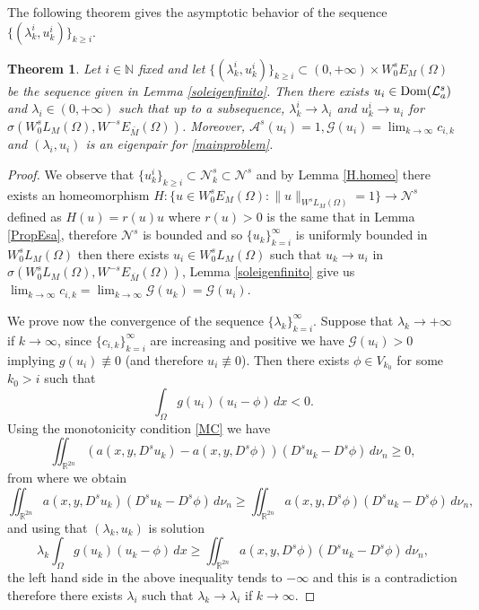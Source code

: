 \documentclass{amsart}
\def\Dom{\text{\normalfont Dom}}
\newcommand{\A}{\mathcal{L}_a^s}
\newcommand{\R}{{\mathbb R}}
\newcommand{\N}{{\mathbb N}}
\newcommand{\EE}{{\mathcal A}^s}
\newcommand{\G}{{\mathcal G}}
\newtheorem{teo}{Theorem}[section]
\theoremstyle{remark}
\theoremstyle{definition}
\numberwithin{equation}{section}
\begin{document}
The following theorem gives the asymptotic behavior of the sequence $\{(\lambda_k^i, u_k^i)\}_{k\ge i}$.
\begin{teo}\label{teolambdaiui}
Let $i\in\N$ fixed and let $\{(\lambda_k^i, u_k^i)\}_{k\ge i}\subset (0, +\infty)\times W^s_0 E_M(\Omega)$ be the sequence given in Lemma \ref{soleigenfinito}. Then there exists $u_i\in \Dom(\A)$ and $\lambda_i\in (0,+\infty)$ such that up to a subsequence, $\lambda_k^i\to \lambda_i$ and $u_k^i\to u_i$ for $\sigma(W_0^sL_M(\Omega),W^{-s}E_{\bar{M}}(\Omega))$. Moreover, $\EE(u_i)=1,\G(u_i)=\lim_{k\to\infty}c_{i,k}$ and $(\lambda_i,u_i)$ is an eigenpair for \eqref{mainproblem}.	
\end{teo}
\begin{proof}
We observe that $\{u_k^i\}_{k\ge i}\subset \mathcal{N}_k^s\subset \mathcal{N}^s$ and by Lemma \ref{H.homeo} there exists an homeomorphism $H\colon \{u\in W_0^s E_M(\Omega)\colon \|u\|_{W^sL_M(\Omega)}=1\}\to \mathcal{N}^s$ defined as $H(u)=r(u)u$ where $r(u)>0$ is the same that in Lemma \ref{PropEsa}, therefore $\mathcal{N}^s$ is bounded and so $\{u_k\}_{k=i}^\infty$ is uniformly bounded  in $W_0^sL_M(\Omega)$ then there exists $u_i\in W_0^sL_M(\Omega)$ such that $u_k\to u_i$ in $\sigma(W_0^sL_M(\Omega),W^{-s}E_{\bar{M}}(\Omega))$, Lemma \ref{soleigenfinito} give us $\lim_{k\to \infty} c_{i,k}=\lim_{k\to\infty}\G(u_k)=\G(u_i)$.

We prove now the convergence of the sequence $\{\lambda_k\}_{k=i}^\infty$. Suppose that $\lambda_k\to +\infty$ if $k\to \infty$, since $\{c_{i,k}\}_{k=i}^{\infty}$ are increasing and positive we have $\G(u_i)>0$ implying $g(u_i)\not\equiv  0$ (and therefore $u_i\not\equiv 0$). Then there exists $\phi\in  V_{k_0}$ for some $k_0>i$ such that 
$$
\int_\Omega g(u_i)(u_i-\phi)\,dx<0.
$$    
Using the monotonicity condition  \eqref{MC} we have
$$
\iint_{\R^{2n}}(a(x,y,D^s u_k)-a(x,y,D^s \phi))(D^s u_k-D^s \phi)\,d\nu_n\geq 0,
$$
from where we obtain
$$
\iint_{\R^{2n}} a(x,y,D^s u_k)(D^s u_k-D^s \phi)\,d\nu_n\geq \iint_{\R^{2n}} a(x,y,D^s \phi )(D^s u_k-D^s \phi)\,d\nu_n, 
$$
and using that $(\lambda_k,u_k)$ is solution 
$$
\lambda_k\int_\Omega g(u_k)(u_k-\phi)\,dx\geq \iint_{\R^{2n}} a(x,y,D^s \phi )(D^s u_k-D^s \phi)\,d\nu_n,
$$
the left hand side in the above inequality tends to $-\infty$ and this is a contradiction therefore there exists $\lambda_i$ such that $\lambda_k\to \lambda_i$ if $k\to\infty$.


\end{proof}
\end{document}
